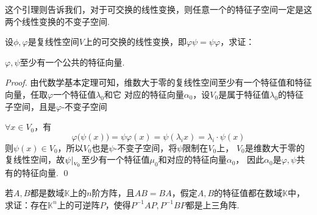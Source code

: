 \begin{remark}
	这个引理则告诉我们，对于可交换的线性变换，则任意一个的特征子空间一定是这两个线性变换的不变子空间.
\end{remark}

\begin{proposition}[公共特征向量]
	设$\phi, \varphi$是复线性空间$V$上的可交换的线性变换，即$\varphi \psi= \psi \varphi $，求证：

	$\varphi, \psi$至少有一个公共的特征向量.
\end{proposition}

\begin{proof}
	由代数学基本定理可知，维数大于零的复线性空间至少有一个特征值和特征向量，任取$\varphi$一个特征值$\lambda_0$和它
	对应的特征向量$\alpha_0$，设$V_0$是属于特征值$\lambda_0$的特征子空间，且是$\varphi$-不变子空间

	$\forall x \in V_0$，有
	$$
		\varphi \bigl(\psi (x) \bigr)= \psi \varphi (x) = \psi (\lambda_i x) = \lambda_i \cdot \psi(x)
	$$
	则$\psi(x) \in V_0$，所以$V_0$也是$\psi$-不变子空间，将$\psi$限制在$V_0$上，
	$V_0$是维数大于零的复线性空间，故$\psi |_{_{V_0}}$至少有一个特征值$\mu_0$和对应的特征向量$\alpha_0$，
	因此$\alpha_0$是$\varphi, \psi$共有的特征向量. \qed
\end{proof}

\begin{proposition}[同时上三角化]
	若$A,B$都是数域$\mathbb{K} $上的$n$阶方阵，且$AB=BA$，假定$A,B$的特征值都在数域$\mathbb{K}$中，
	求证：存在$\mathbb{K} ^n$上的可逆阵$P$，使得$P^{-1} A P,P^{-1} B P$都是上三角阵. 
\end{proposition}

